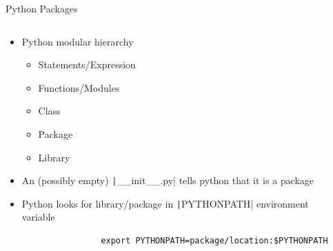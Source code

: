\documentclass[aspectratio=169]{beamer}
\newcommand{\code}[2][python]{\texttt|#2|}
\begin{document}
\begin{frame}[fragile]{Python Packages}
    \begin{columns}
        \begin{column}{0.52\textwidth}
            \begin{itemize}
                \item Python modular hierarchy
                    \begin{itemize}
                        \item Statements/Expression
                        \item Functions/Modules
                        \item Class
                        \item Package
                        \item Library
                    \end{itemize}
                \item An (possibly empty) \code{__init__.py} tells python that it is a package
                \item Python looks for library/package in \code{PYTHONPATH} environment variable\\
            \begin{verbatim}
                export PYTHONPATH=package/location:$PYTHONPATH
            \end{verbatim}

            \end{itemize}
        \end{column}
        \begin{column}{0.46\textwidth}
        \end{column}
    \end{columns}
\end{frame} 
\end{document}
